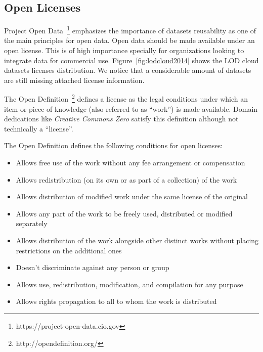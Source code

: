 \begin{figure}[ht!]
\end{figure}

\subsection{Open Licenses}

Project Open Data~\footnote{https://project-open-data.cio.gov} emphasizes the importance of datasets reusability as one of the main principles for open data. Open data should be made available under an open license. This is of high importance specially for organizations looking to integrate data for commercial use. Figure~\ref{fig:lodcloud2014} shows the LOD cloud datasets licenses distribution. We notice that a considerable amount of datasets are still missing attached license information.

The Open Definition~\footnote{http://opendefinition.org/} defines a license as the legal conditions under which an item or piece of knowledge (also referred to as ``work'') is made available. Domain dedications like \emph{Creative Commons Zero} satisfy this definition although not technically a ``license''.

The Open Definition defines the following conditions for open licenses:

\begin{itemize}
	\item Allows free use of the work without any fee arrangement or compensation
	\item Allows redistribution (on its own or as part of a collection) of the work
	\item Allows distribution of modified work under the same license of the original
	\item Allows any part of the work to be freely used, distributed or modified separately
	\item Allows distribution of the work alongside other distinct works without placing restrictions on the additional ones
	\item Doesn't discriminate against any person or group
	\item Allows use, redistribution, modification, and compilation for any purpose
	\item Allows rights propagation to all to whom the work is distributed
\end{itemize}

